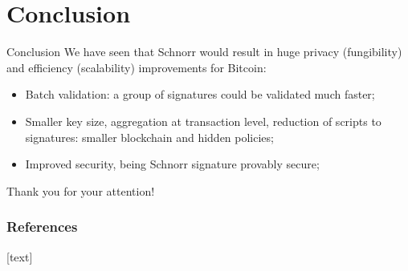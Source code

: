 \documentclass[slidescentered]{beamer}
\begin{document}
	\section{Conclusion}
	\begin{frame}{Conclusion}
		We have seen that Schnorr would result in huge privacy (fungibility) and efficiency (scalability) improvements for Bitcoin:
		\begin{itemize}
			\item  Batch validation: a group of signatures could be validated much faster;
			\item Smaller key size, aggregation at transaction level, reduction of scripts to signatures: smaller blockchain and hidden policies;
			\item Improved security, being Schnorr signature provably secure;
		\end{itemize}
	
	\end{frame}

	\begin{frame}
		\centering
		\huge Thank you for your attention!
		\par
	\end{frame}
	
	\begin{frame}[t, allowframebreaks]
	\frametitle{References}
    	[text]
    	
		\nocite{*}
		
	\end{frame}
	
\end{document}
